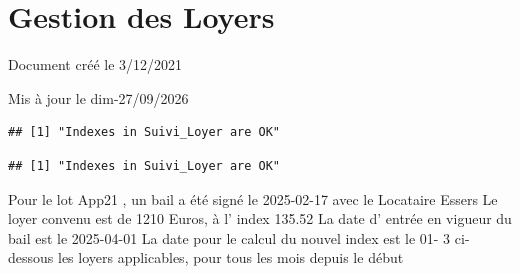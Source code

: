 \documentclass[
]{article}
\author{}
\date{\vspace{-2.5em}}
\begin{document}
\section{Gestion des Loyers}\label{gestion-des-loyers}

Document créé le 3/12/2021

Mis à jour le dim-27/09/2026

\begin{verbatim}
## [1] "Indexes in Suivi_Loyer are OK"
\end{verbatim}

\begin{verbatim}
## [1] "Indexes in Suivi_Loyer are OK"
\end{verbatim}

Pour le lot App21 , un bail a été signé le 2025-02-17 avec le Locataire
Essers Le loyer convenu est de 1210 Euros, à l' index 135.52 La date d'
entrée en vigueur du bail est le 2025-04-01 La date pour le calcul du
nouvel index est le 01- 3 ci-dessous les loyers applicables, pour tous
les mois depuis le début
\end{document}
